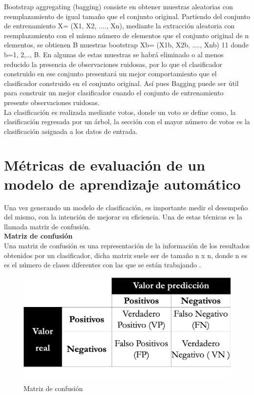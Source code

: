Bootstrap aggregating (bagging) consiste en obtener muestras aleatorias con reemplazamiento de igual tamaño que el conjunto original\citep{CT24}. Partiendo del conjunto de entrenamiento X= (X1, X2, ...., Xn), mediante la extracción aleatoria con reemplazamiento con el mismo número de elementos que el conjunto original de n elementos, se obtienen B muestras bootstrap Xb= (X1b, X2b, ...., Xnb)
11
donde b=1, 2,.., B. En algunas de estas muestras se habrá eliminado o al menos reducido la presencia de observaciones ruidosas, por lo que el clasificador construido en ese conjunto presentará un mejor comportamiento que el clasificador construido en el conjunto original. Así pues Bagging puede ser útil para construir un mejor clasificador cuando el conjunto de entrenamiento presente observaciones ruidosas.\\

La clasificación es realizada mediante votos, donde un voto se define como, la clasificación regresada por un árbol, la sección con el mayor número de votos es la clasificación asignada a los datos de entrada.




\section{Métricas de evaluación de un modelo de aprendizaje automático}


Una vez generando un modelo de clasificación, es importante medir el desempeño del mismo, con
la intención de mejorar su eficiencia. Una de estas técnicas es la llamada matriz de confusión.\\

\textbf{Matriz de confusión}\\

Una matriz de confusión es una representación de la información de los resultados obtenidos por un
clasificador, dicha matriz suele ser de tamaño n x n, donde n es es el número de clases diferentes con
las que se están trabajando \citep{CT23}.

\begin{figure}[H]
	\centering
	\includegraphics[scale=.45]{imagenes/Capitulo3/MatrizC.png}
	\caption{Matriz de confusión}
	\label{Fig:mconfu}
\end{figure}

